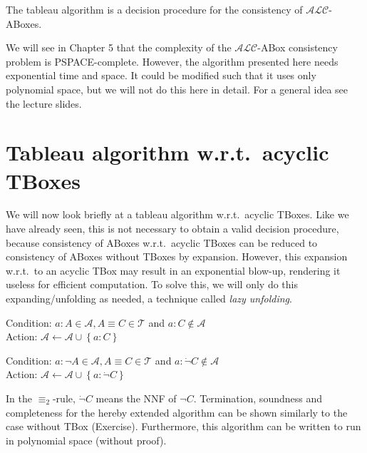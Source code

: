 \begin{theorem}
	The tableau algorithm is a decision procedure for the consistency of  $\mathcal{ALC}$-ABoxes.
\end{theorem}
We will see in Chapter 5 that the complexity of the $\mathcal{ALC}$-ABox consistency problem is \textsc{PSPACE}-complete.
However, the algorithm presented here needs exponential time and space.
It could be modified such that it uses only polynomial space, but we will not do this here in detail.
For a general idea see the lecture slides.

\newpage
\section{Tableau algorithm w.r.t.\ acyclic TBoxes}
We will now look briefly at a tableau algorithm w.r.t.\ acyclic TBoxes.
Like we have already seen, this is not necessary to obtain a valid decision procedure,
because consistency of ABoxes w.r.t.\ acyclic TBoxes can be reduced to consistency of ABoxes without TBoxes by expansion.
However, this expansion w.r.t.\ to an acyclic TBox may result in an exponential blow-up, rendering it useless for efficient computation.
To solve this, we will only do this expanding/unfolding as needed, a technique called \textit{lazy unfolding}.
\begin{mdframed}[frametitle= The $ \equiv_1$-rule]
	Condition: $a : A \in \mathcal{A}, A  \equiv C \in \mathcal{T}$ and $a:C \notin \mathcal{A}$ \\
	Action: $\mathcal{A} \leftarrow \mathcal{A} \cup \left\{ a:C \right\}$
\end{mdframed}
\begin{mdframed}[frametitle= The $ \equiv_2$-rule, nobreak = true]
	Condition: $a : \neg A \in \mathcal{A}, A \equiv C \in \mathcal{T}$ and $a : \dot{\neg} C \notin \mathcal{A}$ \\
	Action: $\mathcal{A} \leftarrow \mathcal{A} \cup \left\{ a: \dot{\neg}C \right\}$
\end{mdframed}
In the $\equiv_2$-rule, $\dot{\neg}C$ means the NNF of $\neg C$.
Termination, soundness and completeness for the hereby extended algorithm can be shown similarly to the case without TBox (Exercise).
Furthermore, this algorithm can be written to run in polynomial space (without proof).

\newpage
